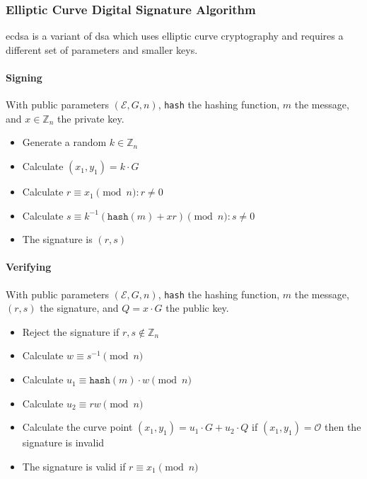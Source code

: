 \subsubsection{Elliptic Curve Digital Signature Algorithm}

\gls{ecdsa} is a variant of \gls{dsa} which uses elliptic curve cryptography and
requires a different set of parameters and smaller keys.

\paragraph{Signing}

With public parameters $(\mathcal{E}, G, n)$, \texttt{hash} the hashing function,
$m$ the message, and $x \in \mathbb{Z}_n$ the private key.

\begin{itemize}
  \item Generate a random $k \in \mathbb{Z}_n$
  \item Calculate $(x_1, y_1) = k \cdot G$
  \item Calculate $r \equiv x_1 \pmod n : r \neq 0$
  \item Calculate $s \equiv k^{-1}(\texttt{hash}(m) + xr) \pmod n : s \neq 0$
  \item The signature is $(r, s)$
\end{itemize}

\paragraph{Verifying}

With public parameters $(\mathcal{E}, G, n)$, \texttt{hash} the hashing function,
$m$ the message, $(r, s)$ the signature, and $Q = x \cdot G$ the public key.

\begin{itemize}
  \item Reject the signature if $r, s \notin \mathbb{Z}_n$
  \item Calculate $w \equiv s^{-1} \pmod n$
  \item Calculate $u_1 \equiv \texttt{hash}(m) \cdot w \pmod n$
  \item Calculate $u_2 \equiv rw \pmod n$
  \item Calculate the curve point $(x_1, y_1) = u_1 \cdot G + u_2 \cdot Q$ if
  $(x_1, y_1) = \mathcal{O}$ then the signature is invalid
  \item The signature is valid if $r \equiv x_1 \pmod n$
\end{itemize}

